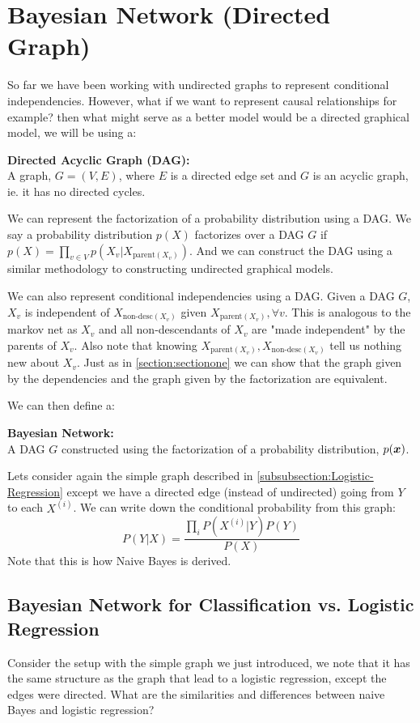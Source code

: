 \section{Bayesian Network (Directed Graph)}\label{section:Bayesian-Network}
So far we have been working with undirected graphs to represent conditional independencies. However, what if we want to represent causal relationships for example? then what might serve as a better model would be a directed graphical model, we will be using a:
\begin{definition}
    \textbf{Directed Acyclic Graph (DAG):} \\
    A graph, $G = (V,E)$, where $E$ is a directed edge set and $G$ is an acyclic graph, ie. it has no directed cycles. 
\end{definition} 
We can represent the factorization of a probability distribution using a DAG. We say a probability distribution $p(X)$ factorizes over a DAG $G$ if $p(X) = \prod_{v \in V} p(X_{v} | X_{ \text{parent}(X_{v}) })$. And we can construct the DAG using a similar methodology to constructing undirected graphical models.

We can also represent conditional independencies using a DAG. Given a DAG $G$, $X_{v}$ is independent of $X_{\text{non-desc}(X_{v})}$ given $X_{\text{parent}(X_{v})}, \forall v$. This is analogous to the markov net as $X_{v}$ and all non-descendants of $X_{v}$ are "made independent" by the parents of $X_{v}$. Also note that knowing $X_{\text{parent}(X_{v})}, X_{\text{non-desc}(X_{v})}$ tell us nothing new about $X_{v}$. Just as in \cref{section:sectionone} we can show that the graph given by the dependencies and the graph given by the factorization are equivalent.

We can then define a:
\begin{definition}
    \textbf{Bayesian Network:} \\
    A DAG $G$ constructed using the factorization of a probability distribution, $p(\bm{x})$.
\end{definition}
Lets consider again the simple graph described in \cref{subsubsection:Logistic-Regression} except we have a directed edge (instead of undirected) going from $Y$ to each $X^{(i)}$. We can write down the conditional probability from this graph:
\begin{equation}
    P(Y|X) = \frac{\prod_{i} P(X^{(i)} | Y) P(Y)}{P(X)}
\end{equation}
Note that this is how Naive Bayes is derived.

\subsection{Bayesian Network for Classification vs. Logistic Regression}
Consider the setup with the simple graph we just introduced, we note that it has the same structure as the graph that lead to a logistic regression, except the edges were directed. What are the similarities and differences between naive Bayes and logistic regression? 

